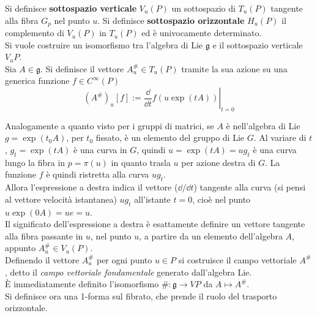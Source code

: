 Si definisce \textbf{sottospazio verticale} $V_u(P)$ un sottospazio di $T_u(P)$
tangente alla fibra $G_p$ nel punto $u$.
Si definisce \textbf{sottospazio orizzontale} $H_u(P)$ il complemento di $V_u(P)$
in $T_u(P)$ ed è univocamente determinato.\\

Si vuole costruire un isomorfismo tra l'algebra di Lie $\mathfrak{g}$ e
il sottospazio verticale $V_u P$.\\

Sia $A \in \mathfrak{g}$.
Si definisce il vettore $A_u^\# \in T_u(P)$ tramite la sua azione su una generica
funzione $f \in C^\infty(P)$
$$
   (A^\#)_u [f] := \left. \frac{\dd}{\dd t} f(u \exp(tA)) \right|_{t=0}
$$

Analogamente a quanto visto per i gruppi di matrici, se $A$ è nell'algebra di Lie
$g = \exp(t_0 A)$, per $t_0$ fissato, è un elemento del gruppo di Lie $G$.
Al variare di $t$, $g_t = \exp(tA)$ è una curva in $G$, quindi $u = \exp(tA) = ug_t$
è una curva lungo la fibra in $p = \pi(u)$ in quanto trasla $u$ per azione
destra di $G$. La funzione $f$ è quindi ristretta alla curva $ug_t$. \\
Allora  l'espressione a destra indica il vettore ($\dd / \dd t$) tangente alla curva
(si pensi al vettore velocità istantanea) $ug_t$ all'istante $t=0$, cioè nel punto
$u\exp(0A) = ue = u$.\\

Il significato dell'espressione a destra è esattamente definire
un vettore tangente alla fibra passante in $u$, nel punto $u$, a partire da
un elemento dell'algebra $A$, appunto $A^\#_u \in V_u(P)$.\\

Definendo il vettore $A^\#_u$ per ogni punto $u \in P$ si costruisce il campo
vettoriale $A^\#$, detto il \emph{campo vettoriale fondamentale} generato
dall'algebra Lie.\\

È immediatamente definito l'isomorfismo $\# : \mathfrak{g} \to VP$ da $A \mapsto A^\#$.\\

Si definisce ora una 1-forma sul fibrato, che prende il ruolo del trasporto
orizzontale.

